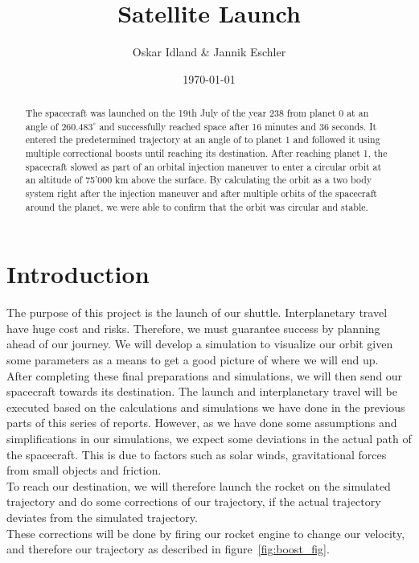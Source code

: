 \documentclass[reprint,english,notitlepage]{revtex4-2}
\begin{document}
\title{Satellite Launch}
\author{Oskar Idland \& Jannik Eschler}
\date{\today}

\begin{abstract}
    The spacecraft was launched on the 19th July of the year 238 from planet 0 at an angle of $260.483^{\circ}$ and successfully reached space after 16 minutes and 36 seconds.
    It entered the predetermined trajectory at an angle of to planet 1 and followed it using multiple correctional boosts until reaching its destination.
    After reaching planet 1, the spacecraft slowed as part of an orbital injection maneuver to enter a circular orbit at an altitude of 75'000 km above the surface.
    By calculating the orbit as a two body system right after the injection maneuver and after multiple orbits of the spacecraft around the planet, we were able to confirm that the orbit was circular and stable.
\end{abstract}
\maketitle

\section{Introduction} \label{sec:introduction}
The purpose of this project is the launch of our shuttle.
Interplanetary travel have huge cost and risks.
Therefore, we must guarantee success by planning ahead of our journey.
We will develop a simulation to visualize our orbit given some parameters as a means to get a good picture of where we will end up.\\

After completing these final preparations and simulations, we will then send our spacecraft towards its destination.
The launch and interplanetary travel will be executed based on the calculations and simulations we have done in the previous parts of this series of reports.
However, as we have done some assumptions and simplifications in our simulations, we expect some deviations in the actual path of the spacecraft.
This is due to factors such as solar winds, gravitational forces from small objects and friction.\\
To reach our destination, we will therefore launch the rocket on the simulated trajectory and do some corrections of our trajectory, if the actual trajectory deviates from the simulated trajectory.\\
These corrections will be done by firing our rocket engine to change our velocity, and therefore our trajectory as described in figure~\ref{fig:boost_fig}.
\end{document}
